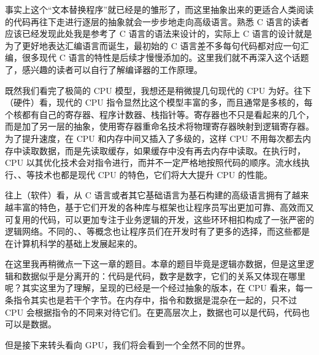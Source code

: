 事实上这个“文本替换程序”就已经是的雏形了，而这里抽象出来的更适合人类阅读的代码再往下走进行逐层的抽象就会一步步地走向高级语言。熟悉 C 语言的读者应该已经发现此处我是参考了 C 语言的语法来设计的，实际上 C 语言的设计就是为了更好地表达汇编语言而诞生，最初始的 C 语言差不多每句代码都对应一句汇编，很多现代 C 语言的特性是后续才慢慢添加的。这里我们就不再深入这个话题了，感兴趣的读者可以自行了解编译器的工作原理。

既然我们看完了极简的 CPU 模型，我想还是稍微提几句现代的 CPU 为好。往下（硬件）看，现代的 CPU 指令显然比这个模型丰富的多，而且通常是多核的，每个核都有自己的寄存器、程序计数器、栈指针等。寄存器也不只是看起来的几个，而是加了另一层的抽象，使用寄存器重命名技术将物理寄存器映射到逻辑寄存器。为了提升速度，在 CPU 和内存中间又插入了多级的，这样 CPU 不用每次都去内存中读取数据，而是先读取缓存，如果缓存中没有再去内存中读取。在执行时，CPU 以其优化技术会对指令进行，而并不一定严格地按照代码的顺序。流水线执行、、等技术也都是现代 CPU 的特色，它们将大大提升 CPU 的性能。

往上（软件）看，从 C 语言或者其它基础语言为基石构建的高级语言拥有了越来越丰富的特色，基于它们开发的各种库与框架也让程序员写出更加可靠、高效而又可复用的代码，可以更加专注于业务逻辑的开发，这些环环相扣构成了一张严密的逻辑网络。不同的、、等概念也让程序员们在开发时有了更多的选择，而这些都是在计算机科学的基础上发展起来的。

在这里我再稍微点一下这一章的题目。本章的题目毕竟是逻辑亦数据，但是这里逻辑和数据似乎是分离开的：代码是代码，数字是数字，它们的关系又体现在哪里呢？其实这里为了理解，呈现的已经是一个经过抽象的版本，在 CPU 看来，每一条指令其实也是若干个字节。在内存中，指令和数据是混杂在一起的，只不过 CPU 会根据指令的不同来对待它们。在更高层次上，数据也可以是代码，代码也可以是数据。

但是接下来转头看向 GPU，我们将会看到一个全然不同的世界。

